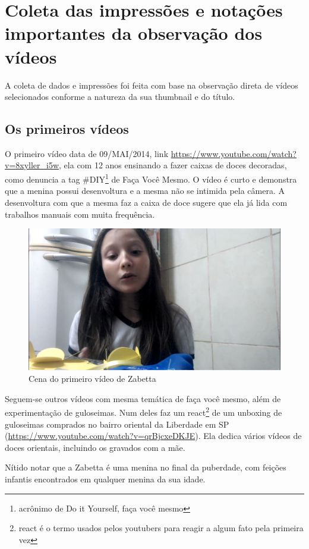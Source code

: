 \section{Coleta das impressões e notações importantes da observação dos vídeos}

A coleta de dados e impressões foi feita com base na observação direta de vídeos selecionados conforme a natureza da sua thumbnail e do título.

\subsection{Os primeiros vídeos}

O primeiro vídeo data de 09/MAI/2014, link \url{https://www.youtube.com/watch?v=8xyller_i5w}, ela com 12 anos ensinando a fazer caixas de doces decoradas, como denuncia a tag \#DIY\footnote{acrônimo de Do it Yourself, faça você mesmo} de Faça Você Mesmo. O vídeo é curto e demonstra que a menina possui desenvoltura e a mesma não se intimida pela câmera. A desenvoltura com que a mesma faz a caixa de doce sugere que ela já lida com trabalhos manuais com muita frequência.

\begin{figure}[h!]
    \centering
    \includegraphics[width=0.7\linewidth]{fig/Zabetta-13-anos-primeiro-video}
    \caption{Cena do primeiro vídeo de Zabetta}
    \label{fig:zabetta-13-anos-primeiro-video}
\end{figure}

Seguem-se outros vídeos com mesma temática de faça você mesmo, além de experimentação de guloseimas. Num deles faz um react\footnote{react é o termo usados pelos youtubers para reagir a algum fato pela primeira vez} de um unboxing de guloseimas comprados no bairro oriental da Liberdade em SP (\url{https://www.youtube.com/watch?v=qrBjcxeDKJE}). Ela dedica vários vídeos de doces orientais, incluindo os gravados com a mãe.

Nítido notar que a Zabetta é uma menina no final da puberdade, com feições infantis encontrados em qualquer menina da sua idade.

